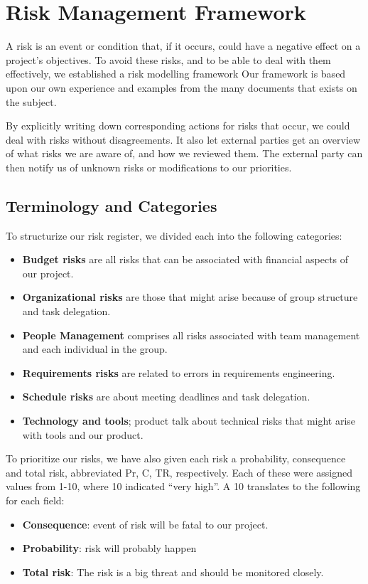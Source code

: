 \chapter{Risk Management Framework}
A risk is an event or condition that, if it occurs, could have a negative
effect on a project's objectives. To avoid these risks, and to be able to deal
with them effectively, we established a risk modelling framework Our
framework is based upon our own experience and examples from the many documents
that exists on the subject.

By explicitly writing down corresponding actions for risks that occur, we could
deal with risks without disagreements. It also let external parties get an
overview of what risks we are aware of, and how we reviewed them. The external
party can then notify us of unknown risks or modifications to our priorities. 

\section{Terminology and Categories}

To structurize our risk register, we divided each into the following
categories:
\begin{itemize}
    \item \textbf{Budget risks} are all risks that can be associated with
        financial aspects of our project.
    \item \textbf{Organizational risks} are those that might arise because of
    group structure and task delegation.
    \item \textbf{People Management} comprises all risks associated with team
        management and each individual in the group.
    \item \textbf{Requirements risks} are related to errors in requirements
        engineering.
    \item \textbf{Schedule risks} are about meeting deadlines and task
        delegation.
    \item \textbf{Technology and tools}; product talk about technical risks that
        might arise with tools and our product.
\end{itemize}

To prioritize our risks, we have also given each risk a probability,
consequence and total risk, abbreviated Pr, C, TR, respectively. Each
of these were assigned values from 1-10, where 10 indicated
``very high''. A 10 translates to
the following for each field:
\begin{itemize}
    \item \textbf{Consequence}: event of risk will be fatal to our project.
    \item \textbf{Probability}: risk will probably happen
    \item \textbf{Total risk}: The risk is a big threat and should be monitored closely.
\end{itemize}

